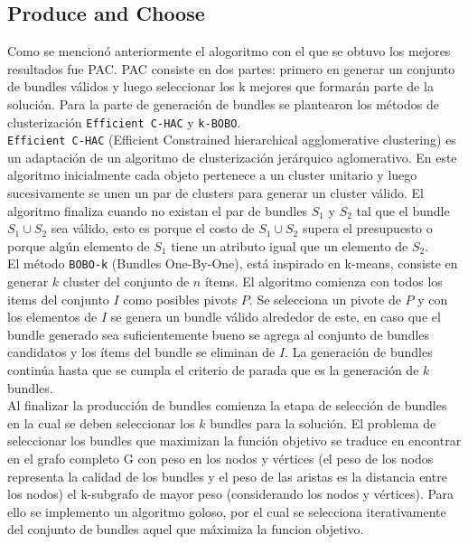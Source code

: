 \subsection{Produce and Choose}
Como se mencionó anteriormente el alogoritmo con el que se obtuvo los mejores resultados fue PAC. PAC consiste en dos partes: primero en generar un conjunto de bundles válidos y luego seleccionar los k mejores que formarán parte de la solución. Para la parte de generación de bundles se plantearon los métodos de clusterización \texttt{Efficient C-HAC} y \texttt{k-BOBO}.\\
\texttt{Efficient C-HAC} (Efficient Constrained hierarchical agglomerative clustering) es un adaptación de un algoritmo de clusterización jerárquico aglomerativo. En este algoritmo inicialmente cada objeto pertenece a un cluster unitario y luego sucesivamente se unen un par de clusters para generar un cluster válido. El algoritmo finaliza cuando no existan el par de bundles $S_1$ y $S_2$ tal que el bundle $S_1 \cup S_2 $ sea válido, esto es porque el costo de $S_1 \cup S_2$ supera el presupuesto o porque algún elemento de $S_1$ tiene un atributo igual que un elemento de $S_2$.\\
El método \texttt{BOBO-k} (Bundles One-By-One), está inspirado en k-means, consiste en generar $k$ cluster del conjunto de $n$ ítems. El algoritmo comienza con todos los items del conjunto $I$ como posibles pivots $P$. Se selecciona un pivote de $P$ y con los elementos de $I$ se genera un bundle válido alrededor de este, en caso que el bundle generado sea suficientemente bueno se agrega al conjunto de bundles candidatos y los ítems del bundle se eliminan de $I$. La generación de bundles continúa hasta que se cumpla el criterio de parada que es la generación de $k$ bundles.\\
Al finalizar la producción de bundles comienza la etapa de selección de bundles en la cual se deben seleccionar los $k$ bundles para la solución. El problema de seleccionar los bundles que maximizan la función objetivo se traduce en encontrar en el grafo completo G con peso en los nodos y vértices (el peso de los nodos representa la calidad de los bundles y el peso de las aristas es la distancia entre los nodos) el k-subgrafo de mayor peso (considerando los nodos y vértices). Para ello se implemento un algoritmo goloso, por el cual se selecciona iterativamente del conjunto de bundles aquel que máximiza la funcion objetivo.\\
